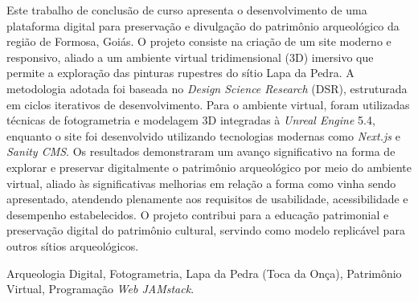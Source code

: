 Este trabalho de conclusão de curso apresenta o desenvolvimento de uma plataforma digital para preservação e divulgação do patrimônio arqueológico da região de Formosa, Goiás. O projeto consiste na criação de um site moderno e responsivo, aliado a um ambiente virtual tridimensional (3D) imersivo que permite a exploração das pinturas rupestres do sítio Lapa da Pedra. A metodologia adotada foi baseada no \textit{Design Science Research} (DSR), estruturada em ciclos iterativos de desenvolvimento. Para o ambiente virtual, foram utilizadas técnicas de fotogrametria e modelagem 3D integradas à \textit{Unreal Engine} 5.4, enquanto o site foi desenvolvido utilizando tecnologias modernas como \textit{Next.js} e \textit{Sanity CMS}. Os resultados demonstraram um avanço significativo na forma de explorar e preservar digitalmente o patrimônio arqueológico por meio do ambiente virtual, aliado às significativas melhorias em relação a forma como vinha sendo apresentado, atendendo plenamente aos requisitos de usabilidade, acessibilidade e desempenho estabelecidos. O projeto contribui para a educação patrimonial e preservação digital do patrimônio cultural, servindo como modelo replicável para outros sítios arqueológicos.

\begin{keywords}
Arqueologia Digital, Fotogrametria, Lapa da Pedra (Toca da Onça), Patrimônio Virtual, Programação \textit{Web JAMstack}.
\end{keywords}



